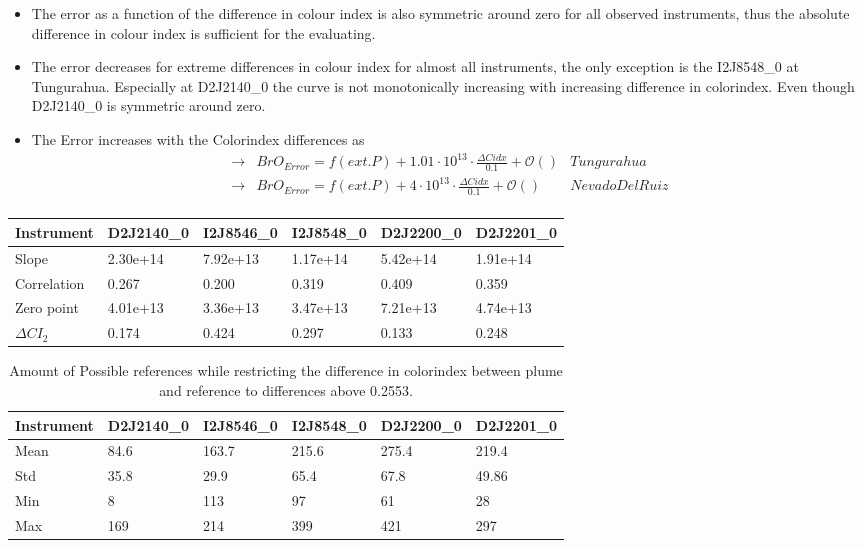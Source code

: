\documentclass  [
  paper    = a4,
  BCOR     = 10mm,
  twoside,
  fontsize = 12pt,
  fleqn,
  toc      = bibnumbered,
  toc      = listofnumbered,
  numbers  = noendperiod,
  headings = normal,
  listof   = leveldown,
  version  = 3.03
]                                       {scrreprt}
\begin{document}
	\begin{itemize}
		\item The   error as a function of the difference in colour index is also symmetric around zero for all observed instruments, thus the absolute difference in colour index is sufficient for the evaluating.
		\item The   error decreases for extreme differences in colour index for almost all instruments, the only exception is the  I2J8548\_0 at Tungurahua. Especially at D2J2140\_0 the curve is not monotonically increasing with increasing difference in colorindex. Even though  D2J2140\_0 is symmetric around zero.
	\end{itemize}
	\begin{itemize}
		\item 	The  Error increases with the Colorindex differences as \\
		\begin{align*}
		\rightarrow&  BrO_{Error} = f(ext. P)+ 1.01\cdot10^{13}\cdot\frac{\Delta Cidx}{0.1} + \mathcal{O}\left(\right) & Tungurahua\\
		\rightarrow&  BrO_{Error} = f(ext. P)+  4\cdot10^{13}\cdot\frac{\Delta Cidx}{0.1} + \mathcal{O}\left(\right) & Nevado Del Ruiz\\
		\end{align*}
	\end{itemize}
	\begin{table}[h]
	\begin{tabular}{|p{2cm}|p{2cm}|p{2cm}|p{2cm}|p{2cm}|p{2cm}|}
			Instrument	&D2J2140\_0&I2J8546\_0& I2J8548\_0&D2J2200\_0&D2J2201\_0\\
			\toprule
			Slope&2.30e+14 &7.92e+13 &1.17e+14 &5.42e+14&1.91e+14\\
			\midrule
			Correlation&
			0.267&
			0.200&
			0.319&
			0.409&
			0.359\\
			\midrule
			Zero point&4.01e+13&3.36e+13&3.47e+13& 7.21e+13& 4.74e+13\\
						\midrule
			$\Delta CI_{2}$&0.174&0.424&0.297&0.133&0.248\\
			\bottomrule
		\end{tabular}
	\end{table}

	\begin{table}[h]
	\begin{tabular}{|p{2cm}|p{2cm}|p{2cm}|p{2cm}|p{2cm}|p{2cm}|}
		Instrument	&D2J2140\_0&I2J8546\_0& I2J8548\_0&D2J2200\_0&D2J2201\_0\\
		\toprule
		Mean&84.6&163.7 &215.6&275.4&219.4\\
		\midrule
		Std&
		35.8&
		29.9&
		65.4&
		67.8&
		49.86\\
		\midrule
		Min&8&113&97&61 &28\\
		\midrule
		Max&169&214&399&421 &297 \\
		\bottomrule
	\end{tabular}
	\caption{Amount of Possible references while restricting the difference in colorindex  between plume and reference to differences above 0.2553.}
\end{table}	
\end{document}
